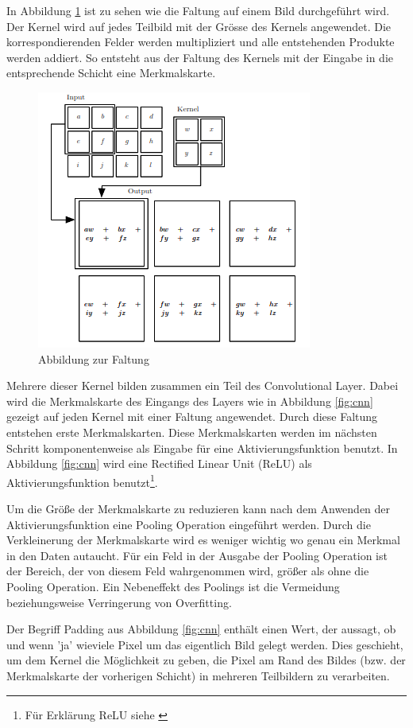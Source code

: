 In Abbildung \ref{fig:faltung} ist zu sehen wie die Faltung auf einem Bild durchgeführt wird. Der Kernel wird auf jedes Teilbild mit der Grösse des Kernels angewendet. Die korrespondierenden Felder werden multipliziert und alle entstehenden Produkte werden addiert. So entsteht aus der Faltung des Kernels mit der Eingabe in die entsprechende Schicht eine Merkmalskarte.
\begin{figure}[H]
 \centering
 \includegraphics[width=0.45 \textwidth,keepaspectratio=true]{images/convolution.png}
 \caption{Abbildung zur Faltung \cite{CNNBook}}
 \label{fig:faltung}
\end{figure}
Mehrere dieser Kernel bilden zusammen ein Teil des Convolutional Layer. Dabei wird die Merkmalskarte des Eingangs des Layers wie in Abbildung \ref{fig:cnn} gezeigt auf jeden Kernel mit einer Faltung angewendet. Durch diese Faltung entstehen erste Merkmalskarten. Diese Merkmalskarten werden im nächsten Schritt komponentenweise als Eingabe für eine Aktivierungsfunktion benutzt. In Abbildung \ref{fig:cnn} wird eine Rectified Linear Unit (ReLU) als Aktivierungsfunktion benutzt\footnote{Für Erklärung ReLU siehe \cite{neural}}.



Um die Größe der Merkmalskarte zu reduzieren kann nach dem Anwenden der Aktivierungsfunktion eine Pooling Operation eingeführt werden. Durch die Verkleinerung der Merkmalskarte wird es weniger wichtig wo genau ein Merkmal in den Daten autaucht. Für ein Feld in der Ausgabe der Pooling Operation ist der Bereich, der von diesem Feld wahrgenommen wird, größer als ohne die Pooling Operation. Ein Nebeneffekt des Poolings ist die Vermeidung beziehungsweise Verringerung von Overfitting. 


Der Begriff Padding aus Abbildung \ref{fig:cnn} enthält einen Wert, der aussagt, ob und wenn 'ja' wieviele Pixel um das eigentlich Bild gelegt werden. Dies geschieht, um dem Kernel die Möglichkeit zu geben, die Pixel am Rand des Bildes (bzw. der Merkmalskarte der vorherigen Schicht) in mehreren Teilbildern zu verarbeiten.



